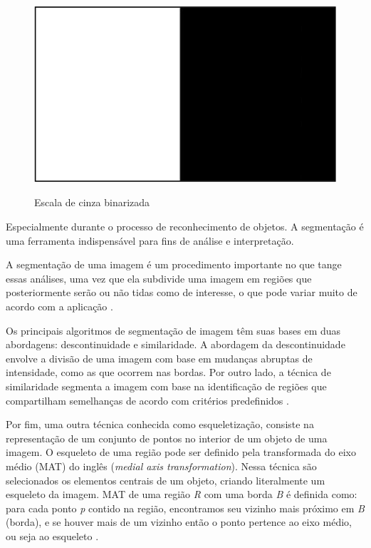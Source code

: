 \begin{figure}[h!]
    \centering
    \caption{Escala de cinza binarizada}
    \includegraphics[scale=0.25]{figuras/escala_binarizada.png} 
    \fonte{}%
    \label{fig:escalabinarizada}
    \centering
\end{figure}

Especialmente durante o processo de reconhecimento de objetos. 
A segmentação é uma ferramenta indispensável para fins de análise e interpretação.

A segmentação de uma imagem é um procedimento importante no que tange
essas análises, uma vez que ela subdivide uma imagem em regiões que
posteriormente serão ou não tidas como de interesse, o que pode variar muito de
acordo com a aplicação \cite{gonzalez2010}.

Os principais algoritmos de segmentação de imagem têm suas bases em duas 
abordagens: descontinuidade e similaridade. A abordagem da descontinuidade 
envolve a divisão de uma imagem com base em mudanças abruptas de 
intensidade, como as que ocorrem nas bordas. Por outro lado, a técnica 
de similaridade segmenta a imagem com base na identificação de regiões 
que compartilham semelhanças de acordo com critérios 
predefinidos \cite{gonzalez2010}.

Por fim, uma outra técnica conhecida como esqueletização, 
consiste na representação de um conjunto de pontos no interior de um 
objeto de uma imagem. O esqueleto de uma região pode
ser definido pela transformada do eixo médio (MAT) do inglês (\textit{medial axis
transformation}). Nessa técnica são selecionados os elementos centrais de um objeto,
criando literalmente um esqueleto da imagem. MAT de uma região \textit{R} com uma borda
\textit{B} é definida como: para cada ponto \textit{p} contido na região, encontramos seu vizinho
mais próximo em \textit{B} (borda), e se houver mais de um vizinho então o ponto pertence
ao eixo médio, ou seja ao esqueleto \cite{gonzalez2010}.

